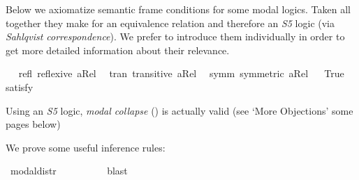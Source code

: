 \begin{isabellebody}
%
\begin{isamarkuptext}%
Below we axiomatize semantic frame conditions for some modal logics. Taken all together they make
 for an equivalence relation and therefore an \emph{S5} logic (via \emph{Sahlqvist correspondence}).
 We prefer to introduce them individually in order to get more detailed information about their relevance.%
\end{isamarkuptext}\isamarkuptrue%
\isamarkupfalse%
\ \isanewline
\ refl{\isacharcolon}\ {\isachardoublequoteopen}reflexive\ aRel{\isachardoublequoteclose}\ \isanewline
\ tran{\isacharcolon}\ {\isachardoublequoteopen}transitive\ aRel{\isachardoublequoteclose}\ \isanewline
\ symm{\isacharcolon}\ {\isachardoublequoteopen}symmetric\ aRel{\isachardoublequoteclose}\isanewline
\ \isanewline
{}\isamarkupfalse%
\ True\ \isamarkupfalse%
{\isacharbrackleft}satisfy{\isacharbrackright}%
\isadelimproof
\ %
\endisadelimproof
%
\isatagproof
{}\isamarkupfalse%
\ %
%
\endisatagproof
{\isafoldproof}%
%
\isadelimproof
%
\endisadelimproof
%
\begin{isamarkuptext}%
Using an \emph{S5} logic, \emph{modal collapse} (\isa{{\isasymlfloor}\isactrlbold {\isasymforall}{\isasymPhi}{\isachardot}{\isacharparenleft}{\isasymPhi}\ \isactrlbold {\isasymrightarrow}\ {\isacharparenleft}\isactrlbold {\isasymbox}\ {\isasymPhi}{\isacharparenright}{\isacharparenright}{\isasymrfloor}}) is actually valid (see `More Objections' some pages below)%
\end{isamarkuptext}\isamarkuptrue%
%
\begin{isamarkuptext}%
We prove some useful inference rules:%
\end{isamarkuptext}\isamarkuptrue%
\isamarkupfalse%
\ modal{\isacharunderscore}distr{\isacharcolon}\ {\isachardoublequoteopen}{\isasymlfloor}\isactrlbold {\isasymbox}{\isacharparenleft}{\isasymphi}\ \isactrlbold {\isasymrightarrow}\ {\isasympsi}{\isacharparenright}{\isasymrfloor}\ {\isasymLongrightarrow}\ {\isasymlfloor}{\isacharparenleft}\isactrlbold {\isasymdiamond}{\isasymphi}\ \isactrlbold {\isasymrightarrow}\ \isactrlbold {\isasymdiamond}{\isasympsi}{\isacharparenright}{\isasymrfloor}{\isachardoublequoteclose}%
\isadelimproof
\ %
\endisadelimproof
%
\isatagproof
{}\isamarkupfalse%
\ blast%
\endisatagproof
{\isafoldproof}%
%
\isadelimproof
%
\endisadelimproof
\isanewline
{}\isamarkupfalse%

\end{isabellebody}
